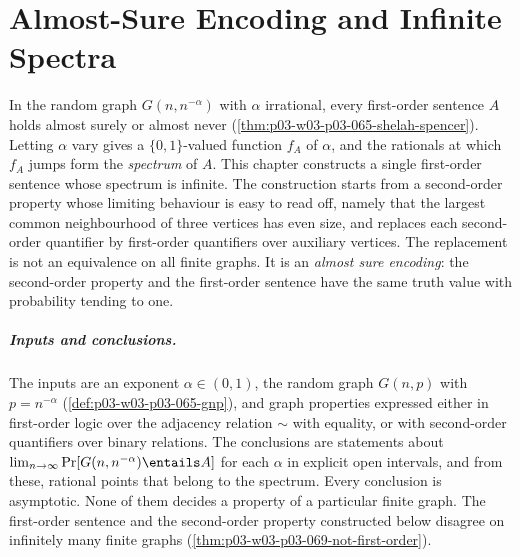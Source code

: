 \chapter{Almost-Sure Encoding and Infinite Spectra}
\label{sec:p03-w03-p03-069-infinite-spectra}

In the random graph \(G(n,n^{-\alpha})\) with \(\alpha\) irrational, every
first-order sentence \(A\) holds almost surely or almost never
(\cref{thm:p03-w03-p03-065-shelah-spencer}).  Letting \(\alpha\) vary gives a
\(\{0,1\}\)-valued function \(f_A\) of \(\alpha\), and the rationals at which
\(f_A\) jumps form the \emph{spectrum} of \(A\).  This chapter constructs a
single first-order sentence whose spectrum is infinite.  The construction
starts from a second-order property whose limiting behaviour is easy to read
off, namely that the largest common neighbourhood of three vertices has even
size, and replaces each second-order quantifier by first-order quantifiers
over auxiliary vertices.  The replacement is not an equivalence on all finite
graphs.  It is an \emph{almost sure encoding}: the second-order property and
the first-order sentence have the same truth value with probability tending
to one.

\paragraph{Inputs and conclusions.}
The inputs are an exponent \(\alpha\in(0,1)\), the random graph
\(G(n,p)\) with \(p=n^{-\alpha}\) (\cref{def:p03-w03-p03-065-gnp}), and
graph properties expressed either in first-order logic over the adjacency
relation \(\sim\) with equality, or with second-order quantifiers over binary
relations.  The conclusions are statements about
\(\lim_{n\to\infty}\Pr[G(n,n^{-\alpha})\entails A]\) for each \(\alpha\) in
explicit open intervals, and from these, rational points that belong to the
spectrum.  Every conclusion is asymptotic.  None of them decides a property of
a particular finite graph.  The first-order sentence and the second-order
property constructed below disagree on infinitely many finite graphs
(\cref{thm:p03-w03-p03-069-not-first-order}).

